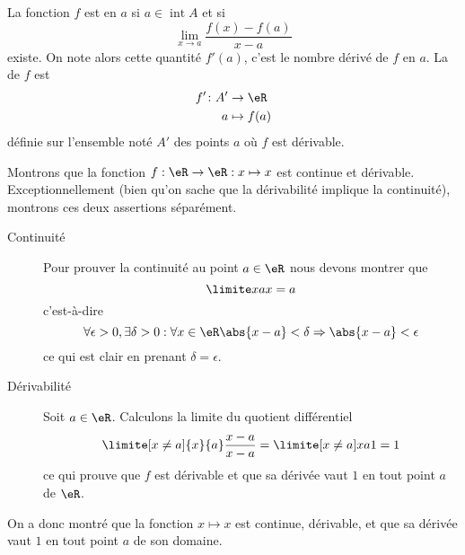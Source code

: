 \begin{definition}      \label{DEFooOYFZooFWmcAB}
    La fonction $f$ est  en \( a\) si $a \in
  \operatorname{int} A$ et si
  \begin{equation*}
    \lim_{x\to a} \frac{f(x)-f(a)}{x-a}
  \end{equation*}
  existe. On note alors cette quantité $f'(a)$, c'est le nombre
  dérivé de $f$ en $a$. La  de $f$ est
  \begin{equation}
      \begin{aligned}
          f'\colon A'&\to \eR \\
          a&\mapsto f(a)
      \end{aligned}
  \end{equation}
  définie sur l'ensemble noté $A'$ des points $a$ où $f$ est dérivable.
\end{definition}

\begin{example}
      Montrons que la fonction $f : \eR \to \eR : x\mapsto x$ est continue et dérivable. Exceptionnellement (bien qu'on sache que la dérivabilité implique la continuité), montrons ces deux assertions séparément.
      \begin{description}
      \item[Continuité] Pour prouver la continuité au point $a \in \eR$ nous devons montrer que
     \begin{equation}
       \limite x a x = a
     \end{equation}
     c'est-à-dire
     \begin{equation}
       \forall \epsilon > 0, \exists \delta > 0 :  \forall x \in \eR \abs{x-a} <
       \delta \Rightarrow \abs{x-a} < \epsilon
     \end{equation}
     ce qui est clair en prenant $\delta = \epsilon$.

      \item[Dérivabilité] Soit $a \in \eR$. Calculons la limite du quotient différentiel
        \begin{equation}
          \limite[x\neq a]{x}{a} \frac{x-a}{x-a} = \limite[x\neq a]x a 1 = 1
        \end{equation}
        ce qui prouve que $f$ est dérivable et que sa dérivée vaut $1$ en
        tout point $a$ de $\eR$.
      \end{description}

     On a donc montré que la fonction $x \mapsto x$ est continue, dérivable, et que sa dérivée vaut $1$ en tout point $a$ de son domaine.

\end{example}


